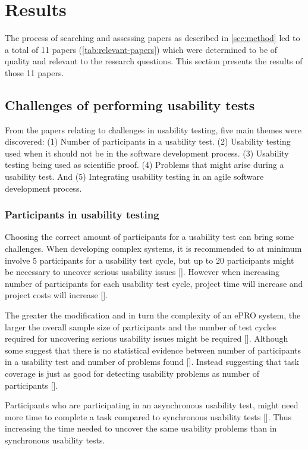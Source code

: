 \section{Results} \label{sec:results}
The process of searching and assessing papers as described in \autoref{sec:method} led to a total of 11 papers (\autoref{tab:relevant-papers}) which were determined to be of quality and relevant to the research questions. This section presents the results of those 11 papers.

\subsection{Challenges of performing usability tests}
From the papers relating to challenges in usability testing, five main themes were discovered: (1) Number of participants in a usability test. (2) Usability testing used when it should not be in the software development process. (3) Usability testing being used as scientific proof. (4) Problems that might arise during a usability test. And (5) Integrating usability testing in an agile software development process.

\subsubsection{Participants in usability testing} \label{sec:participants-in-usability-testing}
Choosing the correct amount of participants for a usability test can bring some challenges. When developing complex systems, it is recommended to at minimum involve 5 participants for a usability test cycle, but up to 20 participants might be necessary to uncover serious usability issues [\cite{ola_2019}]. However when increasing number of participants for each usability test cycle, project time will increase and project costs will increase [\cite{ola_2019}].

The greater the modification and in turn the complexity of an ePRO system, the larger the overall sample size of participants and the number of test cycles required for uncovering serious usability issues might be required [\cite{ola_2019}]. Although some suggest that there is no statistical evidence between number of participants in a usability test and number of problems found [\cite{gl_2007}]. Instead suggesting that task coverage is just as good for detecting usability problems as number of participants [\cite{gl_2007}].

Participants who are participating in an asynchronous usability test, might need more time to complete a task compared to synchronous usability tests [\cite{ola_2019}]. Thus increasing the time needed to uncover the same usability problems than in synchronous usability tests.

